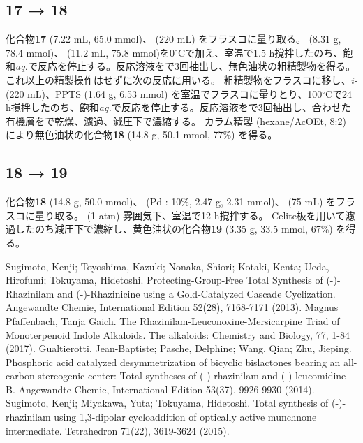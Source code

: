 \documentclass{ltjsarticle}
\theoremstyle{definition}
\numberwithin{equation}{section}
\newcommand{\D}{^\circ\text{C}}
\begin{document}
\subsection{\textbf{17} → \textbf{18}}
化合物\textbf{17}  (7.22 mL, 65.0 mmol)、 (220 mL) をフラスコに量り取る。
 (8.31 g, 78.4 mmol)、 (11.2 mL, 75.8 mmol)を0$\D$で加え、室温で1.5 h撹拌したのち、飽和\textit{aq.}で反応を停止する。反応溶液をで3回抽出し、無色油状の粗精製物を得る。これ以上の精製操作はせずに次の反応に用いる。
粗精製物をフラスコに移し、\textit{i-} (220 mL)、PPTS (1.64 g, 6.53 mmol) を室温でフラスコに量りとり、100$\D$で24 h撹拌したのち、飽和\textit{aq.}で反応を停止する。反応溶液をで3回抽出し、合わせた有機層をで乾燥、濾過、減圧下で濃縮する。
カラム精製 (hexane/AcOEt, 8:2) により無色油状の化合物\textbf{18} (14.8 g, 50.1 mmol, 77\%) を得る。

\subsection{\textbf{18} → \textbf{19}}
化合物\textbf{18} (14.8  g, 50.0 mmol)、 (Pd : 10\%, 2.47 g, 2.31 mmol)、 (75 mL) をフラスコに量り取る。
 (1 atm) 雰囲気下、室温で12 h撹拌する。
 Celite板を用いて濾過したのち減圧下で濃縮し、黄色油状の化合物\textbf{19} (3.35 g, 33.5 mmol, 67\%) を得る。


\begin{thebibliography}{99}
Sugimoto, Kenji; Toyoshima, Kazuki; Nonaka, Shiori; Kotaki, Kenta; Ueda, Hirofumi; Tokuyama, Hidetoshi. Protecting-Group-Free Total Synthesis of (-)-Rhazinilam and (-)-Rhazinicine using a Gold-Catalyzed Cascade Cyclization. Angewandte Chemie, International Edition 52(28), 7168-7171 (2013).
Magnus Pfaffenbach, Tanja Gaich. The Rhazinilam-Leuconoxine-Mersicarpine Triad of Monoterpenoid Indole Alkaloids. The alkaloids: Chemistry and Biology, 77, 1-84 (2017).
Gualtierotti, Jean-Baptiste; Pasche, Delphine; Wang, Qian; Zhu, Jieping. Phosphoric acid catalyzed desymmetrization of bicyclic bislactones bearing an all-carbon stereogenic center: Total syntheses of (-)-rhazinilam and (-)-leucomidine B. Angewandte Chemie, International Edition 53(37), 9926-9930 (2014).
Sugimoto, Kenji; Miyakawa, Yuta; Tokuyama, Hidetoshi. Total synthesis of (-)-rhazinilam using 1,3-dipolar cycloaddition of optically active munchnone intermediate. Tetrahedron 71(22), 3619-3624 (2015).
\end{thebibliography}
\end{document}
